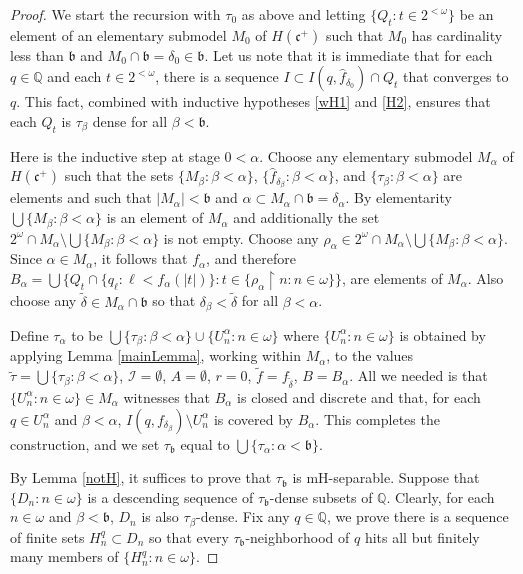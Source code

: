 \documentclass{amsart}
\theoremstyle{definition}
\theoremstyle{remark}
\begin{document}
\begin{proof}
We start the recursion with $\tau_0$ as above and letting
 $\{ Q_t : t\in 2^{<\omega}\}$ be an element of an
 elementary submodel $M_0$ of $H(\mathfrak c^+)$
 such that $M_0$ has cardinality less than $\mathfrak b$
 and $M_0\cap \mathfrak b = \delta_0 \in \mathfrak b$.
 Let us note that it is immediate that for each
  $q\in \mathbb Q$ and each $t\in 2^{<\omega}$, 
  there is a sequence $I\subset I(q,\hat f_{\delta_0})\cap Q_t$
  that converges to $q$. This fact, combined with 
  inductive hypotheses \ref{wH1} and \ref{H2},
   ensures that each $Q_t$ is $\tau_\beta$ dense for all $\beta < \mathfrak b$.

Here is the inductive step at stage $0<\alpha$. Choose
any elementary submodel $M_\alpha$ of $H(\mathfrak c^+)$
such that  the sets $ \{M_\beta :\beta < \alpha\}$, $\{\hat f_{\delta_\beta} : \beta < \alpha\}$,
and $\{\tau_\beta : \beta <\alpha\}$ are elements and such that $|M_\alpha | < \mathfrak b$
and $\alpha\subset M_\alpha\cap \mathfrak b =\delta_\alpha$. 
By elementarity $\bigcup\{ M_\beta : \beta < \alpha\}$ is
an element of $M_\alpha$ and additionally
the set $2^\omega\cap M_\alpha \setminus
\bigcup\{ M_\beta : \beta < \alpha\}$ is not empty.
Choose any $\rho_\alpha \in  2^\omega\cap M_\alpha \setminus
\bigcup\{ M_\beta : \beta < \alpha\}$.  
Since $\alpha\in M_\alpha$, it follows that $f_\alpha $,
and therefore  $B_\alpha =
\bigcup\{ Q_t \cap \{ q_\ell : \ell < f_\alpha(|t|) \}: 
  t\in \{ \rho_\alpha\restriction n : n\in \omega\}\}$,
  are elements of $M_\alpha$. 
Also choose any $\tilde \delta\in M_\alpha\cap \mathfrak b$
   so that $\delta_\beta < \tilde \delta$ for all 
    $\beta  < \alpha$.

  Define
  $\tau_\alpha$ to be $\bigcup\{\tau_\beta :\beta < \alpha \}\cup
  \{U^\alpha_n : n\in \omega\}$ where $\{U^\alpha_n : n\in\omega\}$
  is obtained by applying Lemma \ref{mainLemma}, working within
   $M_\alpha$, to the
  values $\tilde\tau = \bigcup\{\tau_\beta:\beta < \alpha\}$,
  $\mathcal I = \emptyset$,
   $A=\emptyset$, $r=0$, $\tilde f = f_{\tilde\delta}  $,
    $B = B_\alpha$.  All we needed is that
     $\{ U^\alpha_n : n\in \omega\}\in M_\alpha$ witnesses that
      $B_\alpha$ is closed and discrete and that,
      for each $q\in U^\alpha_n $ and $\beta < \alpha$,
       $ I(q,f_{\delta_\beta})\setminus U^\alpha_n$ is covered by $B_\alpha$. 
This completes the construction, and we set $\tau_{\mathfrak b}$
equal to $\bigcup\{ \tau_\alpha : \alpha < \mathfrak b\}$.

By Lemma \ref{notH},  it suffices to prove that $\tau_{\mathfrak b}$
is mH-separable.  Suppose that $\{ D_n : n\in\omega\}$ is a 
descending sequence of $\tau_{\mathfrak b}$-dense subsets of
 $\mathbb Q$. Clearly, for each $n\in\omega$ and $\beta < \mathfrak b$,
  $D_n$ is also $\tau_{\beta}$-dense. Fix any $q\in \mathbb Q$,
  we prove there is a sequence of finite sets $H^q_n\subset D_n$
  so that every $\tau_{\mathfrak b}$-neighborhood of $q$
  hits all but finitely many members of $\{ H^q_n : n\in\omega\}$. 


\end{proof}
\end{document}
